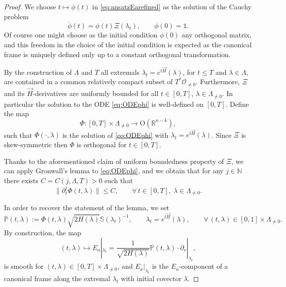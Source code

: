 \documentclass[11pt,a4paper]{article}
\theoremstyle{plain}
\theoremstyle{definition}
\theoremstyle{remark}
\numberwithin{equation}{section}
\newcommand{\R}{\mathbb{R}} %
\newcommand{\N}{\mathbb{N}} %
\renewcommand{\P}{\mathbb{P}}
\renewcommand{\S}{\mathbb{S}}
\begin{document}
\begin{proof}
We choose $t  \mapsto \phi(t)$ in \eqref{eq:ansatzEarefined} as the solution of the Cauchy problem
\begin{equation}\label{eq:ODEphi}
\dot{\phi}(t) = \phi(t) \Xi(\lambda_t), \qquad \phi(0)=\mathbb{1}.
\end{equation}
Of course one might choose as the initial condition $\phi(0)$ any orthogonal matrix, and this freedom in the choice of the initial condition is expected as the canonical frame is uniquely defined only up to a constant orthogonal transformation.

By the construction of $\Lambda$ and $T$ all extremals $\lambda_t=e^{t\vec{H}}(\lambda)$, for $t\leq T$ and $\lambda \in \Lambda$, are contained in a common relatively compact subset of $T^*\mathcal{O}_{\neq 0}$. Furthermore, $\Xi$ and its $\vec{H}$-derivatives are uniformly bounded for all $t\in [0,T]$, $\lambda \in \Lambda_{\neq 0}$. In particular the solution to the ODE \eqref{eq:ODEphi} is well-defined on $[0,T]$. Define the map
\begin{equation}
\Phi : [0,T]\times \Lambda_{\neq 0} \to \mathrm{O}(\R^{n-k}),
\end{equation}
such that $\Phi(\cdot,\lambda)$ is the solution of \eqref{eq:ODEphi} with $\lambda_t=e^{t\vec{H}}(\lambda)$. Since $\Xi$ is skew-symmetric then $\Phi$ is orthogonal for $t\in [0,T]$.

Thanks to the aforementioned claim of uniform boundedness property of $\Xi$, we can apply Gronwall's lemma to \eqref{eq:ODEphi}, and we obtain that for any $j\in \N$ there exists $C = C(j,\Lambda,T)>0$ such that
\begin{equation}\label{eq:boundPhi}
\|\partial_t^{j}\Phi(t,\lambda)\| \leq C, \qquad \forall\, t\in [0,T],\; \lambda \in \Lambda_{\neq 0}.
\end{equation}

In order to recover the statement of the lemma, we set
\begin{equation}
\P(t,\lambda) := \Phi(t,\lambda) \sqrt{2H(\lambda)} \S(\lambda_t)^{-1}, \qquad \lambda_t = e^{t\vec{H}}(\lambda),\qquad \forall\, (t,\lambda)\in [0,1]\times \Lambda_{\neq 0}.
\end{equation}
By construction, the map
\begin{equation}
(t,\lambda)\mapsto E_a|_{\lambda_t} = \frac{1}{\sqrt{2H(\lambda)}} \P(t,\lambda) \cdot \partial_v|_{\lambda_t},
\end{equation}
is smooth for $(t,\lambda) \in [0,T]\times \Lambda_{\neq 0}$, and $E_a|_{\lambda_t}$ is the $E_a$-component of a canonical frame along the extremal $\lambda_t$ with initial covector $\lambda$.


\end{proof}
\end{document}
